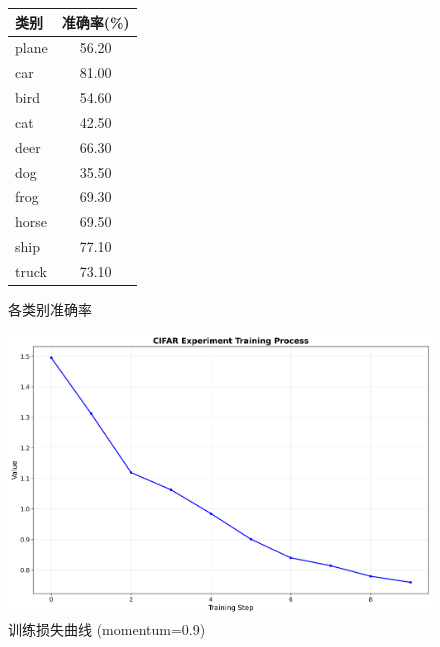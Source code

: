 \documentclass[12pt,a4paper,UTF8]{ctexart}
\begin{document}
\begin{figure}[H]
    \centering
    \begin{minipage}[t]{0.3\textwidth}
        \centering
        \vspace{0pt} %
        \small
        \begin{tabular}{@{}lc@{}}
        \toprule
        类别 & 准确率(\%) \\
        \midrule
        plane & 56.20 \\
        car & 81.00 \\
        bird & 54.60 \\
        cat & 42.50 \\
        deer & 66.30 \\
        dog & 35.50 \\
        frog & 69.30 \\
        horse & 69.50 \\
        ship & 77.10 \\
        truck & 73.10 \\
        \bottomrule
        \end{tabular}
        \caption{各类别准确率}
        \label{tab:class_accuracy}
    \end{minipage}
    \hfill
    \begin{minipage}[t]{0.6\textwidth}
        \centering
        \vspace{0pt} %
        \includegraphics[width=\linewidth]{./cifar_experiment_plot.png}
        \caption{训练损失曲线 (momentum=0.9)}
        \label{fig:loss_curve}
    \end{minipage}
\end{figure}
\end{document}
